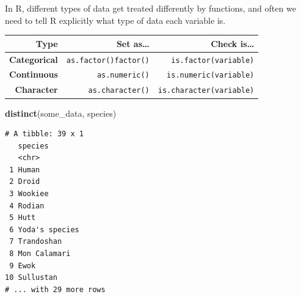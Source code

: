 \documentclass[]{book}
\newenvironment{Shaded}{\begin{snugshade}}{\end{snugshade}}
\newcommand{\DataTypeTok}[1]{\textcolor[rgb]{0.13,0.29,0.53}{#1}}
\newcommand{\KeywordTok}[1]{\textcolor[rgb]{0.13,0.29,0.53}{\textbf{#1}}}
\newcommand{\NormalTok}[1]{#1}
\newcommand{\OperatorTok}[1]{\textcolor[rgb]{0.81,0.36,0.00}{\textbf{#1}}}
\newcommand{\StringTok}[1]{\textcolor[rgb]{0.31,0.60,0.02}{#1}}
\begin{document}
In R, different types of data get treated differently by functions, and often we need to tell R explicitly what type of data each variable is.

\begin{longtable}[]{@{}rrr@{}}
\toprule
\textbf{Type} & \textbf{Set as\ldots{}} & \textbf{Check is\ldots{}}\tabularnewline
\midrule
\endhead
\textbf{Categorical} & \texttt{as.factor()}\texttt{factor()} & \texttt{is.factor(variable)}\tabularnewline
\textbf{Continuous} & \texttt{as.numeric()} & \texttt{is.numeric(variable)}\tabularnewline
\textbf{Character} & \texttt{as.character()} & \texttt{is.character(variable)}\tabularnewline
\bottomrule
\end{longtable}

\begin{Shaded}
\begin{Highlighting}[]
\KeywordTok{distinct}\NormalTok{(some_data, species)}
\end{Highlighting}
\end{Shaded}

\begin{verbatim}
# A tibble: 39 x 1
   species       
   <chr>         
 1 Human         
 2 Droid         
 3 Wookiee       
 4 Rodian        
 5 Hutt          
 6 Yoda's species
 7 Trandoshan    
 8 Mon Calamari  
 9 Ewok          
10 Sullustan     
# ... with 29 more rows
\end{verbatim}

\begin{Shaded}
\end{Shaded}
\end{document}
